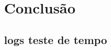 \documentclass[
	12pt,				%
	openright,			%
	oneside,			%
	a4paper,			%
	english,			%
	french,				%
	spanish,			%
	brazil,				%
	]{abntex2}
\begin{document}
 \chapter{Conclusão}
 \label{ch: conclusao}
 



% 

\postextual




%
%



\begin{anexosenv}

\partanexos

\chapter{logs teste de tempo}
%
\end{anexosenv}


\printindex
\end{document}
